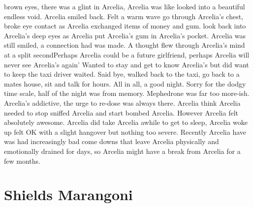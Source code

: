 \documentclass[12pt]{book}
\begin{document}
brown eyes, there was a glint in Arcelia, Arcelia was like looked into a beautiful endless void. Arcelia smiled back. Felt a warm wave go through Arcelia's chest, broke eye contact as Arcelia exchanged items of money and gum. look back into Arcelia's deep eyes as Arcelia put Arcelia's gum in Arcelia's pocket. Arcelia was still smiled, a connection had was made. A thought flew through Arcelia's mind at a split secondPerhaps Arcelia could be a future girlfriend, perhaps Arcelia will never see Arcelia's again' Wanted to stay and get to know Arcelia's but did want to keep the taxi driver waited. Said bye, walked back to the taxi, go back to a mates house, sit and talk for hours. All in all, a good night. Sorry for the dodgy time scale, half of the night was from memory. Mephedrone was far too more-ish. Arcelia's addictive, the urge to re-dose was always there. Arcelia think Arcelia needed to stop sniffed Arcelia and start bombed Arcelia. However Arcelia felt absolutely awesome. Arcelia did take Arcelia awhile to get to sleep, Arcelia woke up felt OK with a slight hangover but nothing too severe. Recently Arcelia have was had increasingly bad come downs that leave Arcelia physically and emotionally drained for days, so Arcelia might have a break from Arcelia for a few months.






\chapter{Shields Marangoni}
\end{document}
